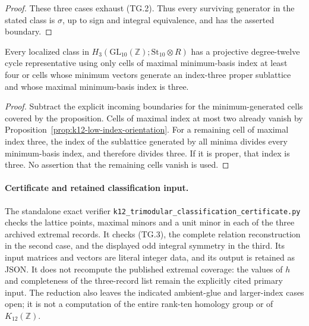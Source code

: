 \begin{proof}
These three cases exhaust (TG.2). Thus every surviving generator
in the stated class is $\sigma$, up to sign and integral
equivalence, and has the asserted boundary.
\end{proof}

\begin{corollary}
Every localized class in
$H_3(\mathrm{GL}_{10}(\mathbb Z);\mathrm{St}_{10}\otimes R)$
has a projective degree-twelve cycle representative using only
cells of maximal minimum-basis index at least four or cells
whose minimum vectors generate an index-three proper sublattice
and whose maximal minimum-basis index is three.
\end{corollary}

\begin{proof}
Subtract the explicit incoming boundaries for the
minimum-generated cells covered by the proposition. Cells of
maximal index at most two already vanish by
Proposition~\ref{prop:k12-low-index-orientation}. For a remaining
cell of maximal index three, the index of the sublattice generated
by all minima divides every minimum-basis index, and therefore
divides three. If it is proper, that index is three. No assertion
that the remaining cells vanish is used.
\end{proof}

\paragraph{Certificate and retained classification input.}
The standalone exact verifier
\texttt{k12\_trimodular\_classification\_certificate.py}
checks the lattice points, maximal minors and a unit minor in
each of the three archived extremal records. It checks (TG.3),
the complete relation reconstruction in the second case, and
the displayed odd integral symmetry in the third. Its input
matrices and vectors are literal integer data, and its output
is retained as JSON. It does not recompute the published
extremal coverage: the values of $h$ and completeness of the
three-record list remain the explicitly cited primary input.
The reduction also leaves the indicated ambient-glue and
larger-index cases open; it is not a computation of the entire
rank-ten homology group or of $K_{12}(\mathbb Z)$.
